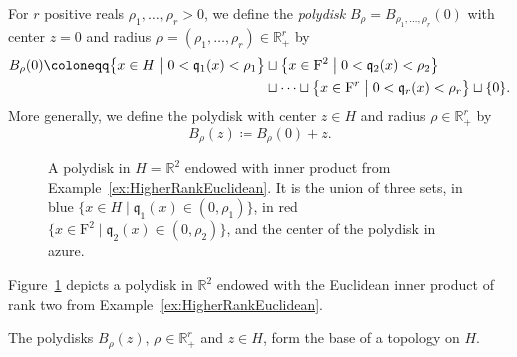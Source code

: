 \documentclass[AHL,Unicode,longabstracts]{cedram}
\newcommand{\filter}{\mathrm{F}}
\newcommand{\R}{\mathbb{R}}
\newcommand{\qf}{\mathfrak{q}}
\begin{document}
For $r$ positive reals $\rho_1, \dots, \rho_r>0$, we define the \emph{polydisk} $B_\rho=B_{\rho_1, \dots, \rho_r}(0)$ with center $z = 0$ and radius $\rho=(\rho_1, \dots, \rho_r) \in \R_+^r$ by
\begin{align*}
B_{\rho}(0)\coloneqq \bigl\{x\in H \bigm| 0<\qf_1(x) <\rho_1\bigr\} &\sqcup \bigl\{x\in \filter^2  \bigm| 0<\qf_2(x) <\rho_2\bigr\}  \\
&\sqcup \dots \sqcup \bigl\{x\in \filter^r \bigm| 0<\qf_r(x) <\rho_r\bigr\}\sqcup\{0\}.
\end{align*}
More generally, we define the polydisk with center $z\in H$ and radius $\rho \in \R_+^r$ by
\[
B_{\rho}(z)\coloneqq B_{\rho}(0) + z.
\]


\begin{figure}[!t]
\centering
{}
\caption{A polydisk in $H=\R^2$ endowed with inner product from Example~\ref{ex:HigherRankEuclidean}. It is the union of three sets, in blue $\{x\in H\mid \qf_1(x) \in(0, \rho_1)\}$, in red $\{x\in \filter^2 \mid \qf_2(x)\in (0, \rho_2)\}$, and the center of the polydisk in azure.}\label{fig:polydisk}
\end{figure}

Figure~\ref{fig:polydisk} depicts a polydisk in $\R^2$ endowed with the Euclidean inner product of rank two from Example~\ref{ex:HigherRankEuclidean}.

\begin{theo} The polydisks $B_{\rho}(z)$, $\rho\in \R_+^r$ and $z\in H$, form the base of a topology on $H$.
\end{theo}
\end{document}
